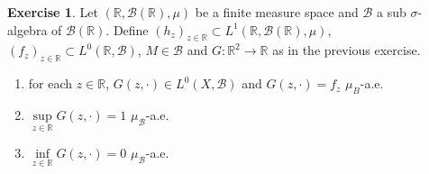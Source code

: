 \documentclass[12pt]{amsart}
\theoremstyle{definition}
\newtheorem{ex}[definition]{Exercise}
\newcommand{\sig}{\sigma}
\newcommand{\R}{\mathbb{R}}
\newcommand{\MB}{\mathcal{B}}
\begin{document}
	\begin{ex}
		Let $(\R, \MB(\R), \mu)$ be a finite measure space and $\MB$ a sub $\sig$-algebra of $\MB(\R)$. Define $(h_z)_{z \in \R} \subset L^1(\R, \MB(\R), \mu)$, $(f_z)_{z \in \R} \subset L^0(\R, \MB)$, $M \in \MB$ and $G:\R^2 \rightarrow \R$ as in the previous exercise.
		\begin{enumerate}
			\item for each $z \in \R$, $G(z, \cdot) \in L^0(X, \MB)$ and $G(z, \cdot) = f_z$ $\mu_B$-a.e.
			\item $\sup\limits_{z \in \R} G(z, \cdot) = 1$ $\mu_{\MB}$-a.e.
			\item $\inf\limits_{z \in \R} G(z, \cdot) = 0$ $\mu_{\MB}$-a.e.
		\end{enumerate}
	\end{ex}
	
\end{document}
